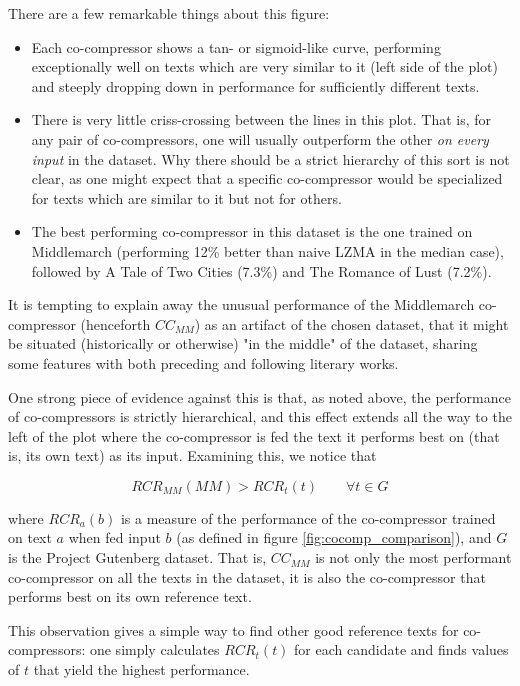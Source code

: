 There are a few remarkable things about this figure:

\begin{itemize}
    \item Each co-compressor shows a tan- or sigmoid-like curve, performing exceptionally well on texts which are very similar to it (left side of the plot) and steeply dropping down in performance for sufficiently different texts.
    \item There is very little criss-crossing between the lines in this plot. That is, for any pair of co-compressors, one will usually outperform the other \emph{on every input} in the dataset. Why there should be a strict hierarchy of this sort is not clear, as one might expect that a specific co-compressor would be specialized for texts which are similar to it but not for others.
    \item The best performing co-compressor in this dataset is the one trained on Middlemarch (performing 12\% better than naive LZMA in the median case), followed by A Tale of Two Cities (7.3\%) and The Romance of Lust (7.2\%).
\end{itemize}

It is tempting to explain away the unusual performance of the Middlemarch co-compressor (henceforth $CC_{MM}$) as an artifact of the chosen dataset, that it might be situated (historically or otherwise) "in the middle" of the dataset, sharing some features with both preceding and following literary works.

One strong piece of evidence against this is that, as noted above, the performance of co-compressors is strictly hierarchical, and this effect extends all the way to the left of the plot where the co-compressor is fed the text it performs best on (that is, its own text) as its input. Examining this, we notice that

$$RCR_{MM}(MM) > RCR_t(t) \qquad \forall t \in G$$

where $RCR_a(b)$ is a measure of the performance of the co-compressor trained on text $a$ when fed input $b$ (as defined in figure \ref{fig:cocomp_comparison}), and $G$ is the Project Gutenberg dataset. That is, $CC_{MM}$ is not only the most performant co-compressor on all the texts in the dataset, it is also the co-compressor that performs best on its own reference text.

This observation gives a simple way to find other good reference texts for co-compressors: one simply calculates $RCR_t(t)$ for each candidate and finds values of $t$ that yield the highest performance.

